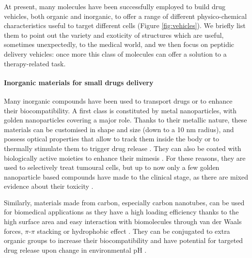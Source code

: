 At present, many molecules have been successfully employed to build drug vehicles, both organic and inorganic, to offer a range of different physico-chemical characteristics useful to target different cells \citep{Hughes2005} (Figure \ref{fig:vehicles}). We briefly list them to point out the variety and exoticity of structures which are useful, sometimes unexpectedly, to the medical world, and we then focus on peptidic delivery vehicles: once more this class of molecules can offer a solution to a therapy-related task.

\paragraph{Inorganic materials for small drugs delivery}


Many inorganic compounds have been used to transport drugs or to enhance their biocompatibility. A first class is constituted by metal nanoparticles, with golden nanoparticles covering a major role. Thanks to their metallic nature, these materials can be customised in shape and size (down to a 10 nm radius), and possess optical properties that allow to track them inside the body or to thermally stimulate them to trigger drug release \citep{Boisselier2009}. They can also be coated with biologically active moieties to enhance their mimesis \citep{Singh2018}. For these reasons, they are used to selectively treat tumoural cells, but up to now only a few golden nanoparticle based compounds have made to the clinical stage, as there are mixed evidence about their toxicity \citep{Boisselier2009}. 

Similarly, materials made from carbon, especially carbon nanotubes, can be used for biomedical applications as they have a high loading efficiency thanks to the high surface area and easy interaction with biomolecules through van der Waals forces, $\pi$-$\pi$ stacking or hydrophobic effect \citep{Erol2017}. They can be conjugated to extra organic groups to increase their biocompatibility and have potential for targeted drug release upon change in environmental pH \citep{Depan2011}.

